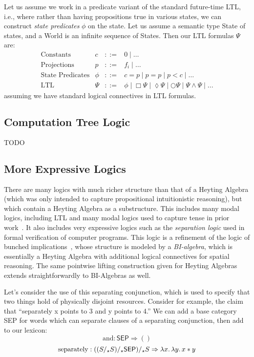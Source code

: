 \documentclass[11pt,a4paper,acceptedWithA]{article}
\begin{document}
Let us assume we work in a predicate variant of the standard future-time \textsc{LTL}, i.e., where rather than having propositions true in various states, we can construct \emph{state predicates} $\phi$ on the state.  
Let us assume a semantic type \textsf{State} of states, and a \textsf{World} is an infinite sequence of \textsf{State}s.
Then our \textsc{LTL} formulas $\Psi$ are:
\[\begin{array}{rrcl}
\textrm{Constants}&c & ::= & 0 \mid \ldots\\
\textrm{Projections}&p & ::= & f_i \mid \ldots\\
\textrm{State Predicates}&\phi &::=& c = p \mid p = p \mid p < c \mid \ldots\\
\textrm{LTL} &\Psi &::=& \phi \mid \Box\Psi \mid \lozenge\Psi \mid \bigcirc\Psi \mid \Psi\land\Psi\mid ...
\end{array}\]
assuming we have standard logical connectives in LTL formulas. 

\subsection{Computation Tree Logic}
TODO

\subsection{More Expressive Logics}
There are many logics with much richer structure than that of a Heyting Algebra (which was only intended to capture propositional intuitionistic reasoning), but which contain a Heyting Algebra as a substructure.  This includes many modal logics, including \textsc{LTL} and many modal logics used to capture tense in prior work~.  It also includes very expressive logics such as the \emph{separation logic} used in formal verification of computer programs.  This logic is a refinement of the logic of bunched implications~\cite{ohearn1999bunched}, whose structure is modeled by a \emph{BI-algebra}, which is essentially a Heyting Algebra with additional logical connectives for spatial reasoning.
The same pointwise lifting construction given for Heyting Algebras extends straightforwardly to BI-Algebras as well.


Let's consider the use of this separating conjunction, which is used to specify that two things hold of physically disjoint resources.  Consider for example, the claim that ``separately x points to 3 and y points to 4.''
We can add a base category \textsf{SEP} for words which can separate clauses of a separating conjunction, then add to our lexicon:
\[\textrm{and} : \textsf{SEP} \Rightarrow ()\]
\[\textrm{separately} : ((S/_\star S)/_\star \textsf{SEP})/_\star S \Rightarrow \lambda x\ldotp\lambda y\ldotp x \ast y \]
\end{document}
